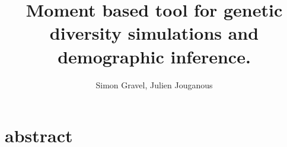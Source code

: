 \documentclass[11pt,a4paper]{article}
\title{\bf Moment based tool for genetic diversity simulations and demographic inference.}
\author{Simon Gravel, Julien Jouganous}
\begin{document}
\maketitle

\section*{abstract}










\nocite{*}



\end{document}
